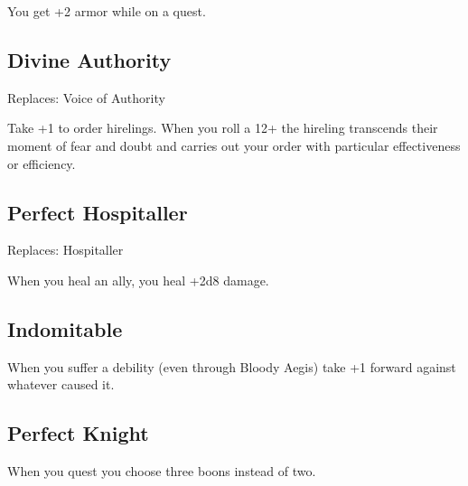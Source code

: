  You get +2 armor while on a quest.
\subsection{Divine Authority}


 Replaces: Voice of Authority


 Take +1 to order hirelings. When you roll a 12+ the hireling transcends their moment of fear and doubt and carries out your order with particular effectiveness or efficiency.
\subsection{Perfect Hospitaller}


 Replaces: Hospitaller


 When you heal an ally, you heal +2d8 damage.
\subsection{Indomitable}


 When you suffer a debility (even through Bloody Aegis) take +1 forward against whatever caused it.
\subsection{Perfect Knight}


 When you quest you choose three boons instead of two.


